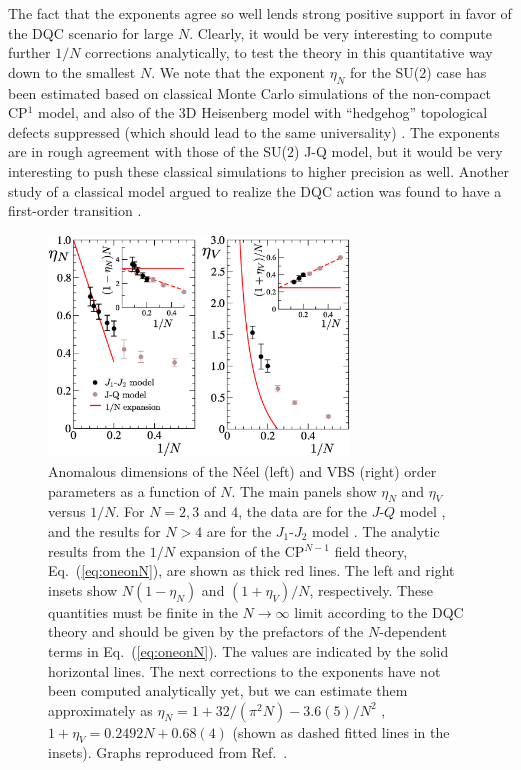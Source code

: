 \documentclass[10pt,pre,aps,twocolumn,showpacs,subscriptaddresses,floatfix]{revtex4}
\begin{document}
The fact that the exponents agree so well lends strong positive support in favor of the DQC scenario for large $N$. Clearly, it would be 
very interesting to compute further $1/N$ corrections analytically, to test the theory in this quantitative way down to the smallest $N$. We note 
that the exponent $\eta_N$ for the SU($2$) case has been estimated based on classical Monte Carlo simulations of the non-compact CP$^1$ model, and
also of the 3D Heisenberg model with ``hedgehog'' topological defects suppressed (which should lead to the same universality) \cite{Motrunich04}. 
The exponents are in rough agreement with those of the SU($2$) J-Q model, but it would be very interesting to push these classical simulations to 
higher precision as well. Another study of a classical model argued to realize the DQC action was found to have a first-order 
transition \cite{Kuklov08}.

\begin{figure}
\includegraphics[width=8cm, clip]{fig07.eps}
 \caption{ \label{fig:exp} Anomalous dimensions of the N\'eel (left) and VBS (right)
  order parameters as a function of $N$. The main panels show $\eta_N$ and $\eta_V$ versus $1/N$. For $N=2,3$ and $4$, the data are 
  for the $J$-$Q$ model \cite{lou2009:sun}, and the results for $N>4$ are for the $J_1$-$J_2$ model \cite{kaul2011:j1j2}. The analytic 
  results from the $1/N$ expansion of the CP$^{N-1}$ field theory, Eq.~(\ref{eq:oneonN}), are shown as thick red lines. The left and 
  right insets show $N(1-\eta_N)$ and $(1+\eta_V)/N$, respectively. These quantities must be finite in the  $N\rightarrow \infty$ 
  limit according to the DQC theory and should be given by the prefactors of the $N$-dependent terms in Eq.~(\ref{eq:oneonN}). The values
  are indicated by the solid horizontal lines. The next corrections to the exponents have not been computed analytically yet, but we can estimate 
  them approximately as $\eta_N = 1+32/(\pi^2 N)-3.6(5)/N^2$ , $1+\eta_V = 0.2492 N + 0.68(4)$ (shown as dashed fitted lines in the insets). 
  Graphs reproduced from Ref.~\cite{kaul2011:j1j2}.}
\end{figure}
\end{document}
